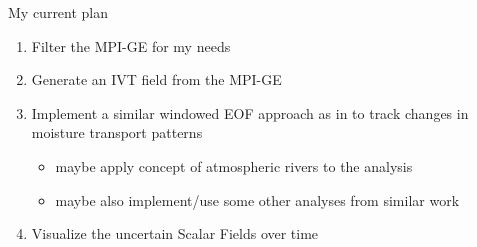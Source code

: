 \begin{frame}{My current plan}
  
  {\large
  \begin{enumerate}
    \item Filter the MPI-GE for my needs
    \item Generate an IVT field from the MPI-GE
    \item Implement a similar windowed EOF approach as in \cite{vietinghoff_visual_2021} to track changes in moisture transport patterns
      \begin{itemize}
        \item maybe apply concept of atmospheric rivers to the analysis
        \item maybe also implement/use some other analyses from similar work 
      \end{itemize}
    \item Visualize the uncertain Scalar Fields over time
  \end{enumerate}
}
\end{frame}
